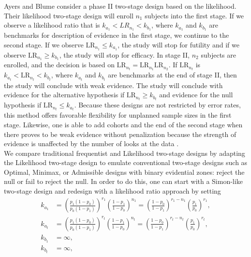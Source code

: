 \documentclass[12pt]{report}\usepackage[]{graphicx}\usepackage[]{color}
\newlength{\li}\setlength{\li}{14.48pt}
\newlength{\di}\setlength{\di}{-3.5mm}
\begin{document}
\indent Ayers and Blume \cite{Ayers} consider a phase II two-stage design based on the likelihood. Their likelihood two-stage design will enroll $n_1$ subjects into the first stage. If we observe a likelihood ratio that is $k_{a_1} < LR_{n_1} < k_{b_1}$, where $k_{a_1}$ and $k_{b_1}$ are benchmarks for description of evidence in the first stage, we continue to the second stage. If we observe $\mbox{LR}_{n_1} \leq k_{a_1}$, the study will stop for futility and if we observe $\mbox{LR}_{n_1} \geq k_{b_1}$, the study will stop for efficacy. In stage II, $n_2$ subjects are enrolled, and the decision is based on $\mbox{LR}_{n_t} = \mbox{LR}_{n_1}\mbox{LR}_{n_2}$. If $\mbox{LR}_{n_t}$ is $k_{a_t} < \mbox{LR}_{n_t} < k_{b_t}$, where $k_{a_t}$ and $k_{b_t}$ are benchmarks at the end of stage II, then the study will conclude with weak evidence. The study will conclude with evidence for the alternative hypothesis if $\mbox{LR}_{n_t} \geq k_{b_t}$ and evidence for the null hypothesis if $\mbox{LR}_{n_t} \leq k_{a_t}$. Because these designs are not restricted by error rates, this method offers favorable flexibility for unplanned sample sizes in the first stage. Likewise, one is able to add cohorts and the end of the second stage when there proves to be weak evidence without penalization because the strength of evidence is unaffected by the number of looks at the data \cite{Blume2002}. \\

\indent We compare traditional frequentist and Likelihood two-stage designs by adapting the Likelihood two-stage design to emulate conventional two-stage designs such as Optimal, Minimax, or Admissible designs with binary evidential zones: reject the null or fail to reject the null. In order to do this, one can start with a Simon-like two-stage design and redesign with a likelihood ratio approach by setting
\begin{equation}
\begin{aligned}
k_{a_1} &= \left(\frac{p_1(1-p_0)}{p_0(1-p_1)}\right)^{r_1} \left(\frac{1-p_1}{1-p_0}\right)^{n_1} = \left(\frac{1-p_0}{1-p_1}\right)^{r_1-n_1} \left(\frac{p_1}{p_0}\right)^{r_1},\\ 
k_{a_t}  &= \left(\frac{p_1(1-p_0)}{p_0(1-p_1)}\right)^{r_t} \left(\frac{1-p_1}{1-p_0}\right)^{n_t} = \left(\frac{1-p_0}{1-p_1}\right)^{r_t-n_t} \left(\frac{p_1}{p_0}\right)^{r_t},\\ k_{b_1} &= \infty, \\
k_{b_t} &= \infty,
\end{aligned}
\end{equation}
\end{document}
